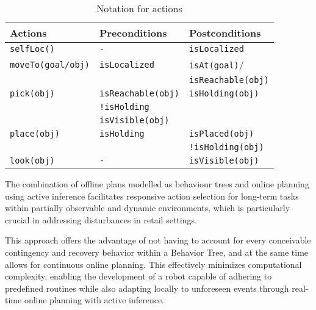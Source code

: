 \begin{table}[h]
\caption{Notation for actions}%
\centering %
\begin{tabular}{p{2.5cm}p{2.5cm}p{2.5cm}} %
\toprule
    \textbf{Actions}& \textbf{Preconditions}& \textbf{Postconditions}\\ 
    \midrule
    \texttt{selfLoc()} & \texttt{-} & \texttt{isLocalized} \\
    \texttt{moveTo(goal\slash obj)} & \texttt{isLocalized} & \texttt{isAt(goal)}\slash \\
    & & \texttt{isReachable(obj)} \\  
    \texttt{pick(obj)} & \texttt{isReachable(obj)}& \texttt{isHolding(obj)}\\ 
     & \texttt{!isHolding} & \\
     & \texttt{isVisible(obj)} & \\
    \texttt{place(obj)} & \texttt{isHolding}& \texttt{isPlaced(obj)}\\
    &  & \texttt{!isHolding(obj)}\\
    \texttt{look(obj)} & \texttt{-} & \texttt{isVisible(obj)}\\
    \bottomrule
\end{tabular}
\end{table}
%
%

The combination of offline plans modelled as behaviour trees and online planning using active inference facilitates responsive action selection for long-term tasks within partially observable and dynamic environments, which is particularly crucial in addressing disturbances in retail settings. 

 This approach offers the advantage of not having to account for every conceivable contingency and recovery behavior within a Behavior Tree, and at the same time allows for continuous online planning.
 This effectively minimizes computational complexity, enabling the development of a robot capable of adhering to predefined routines while also adapting locally to unforeseen events through real-time online planning with active inference.
